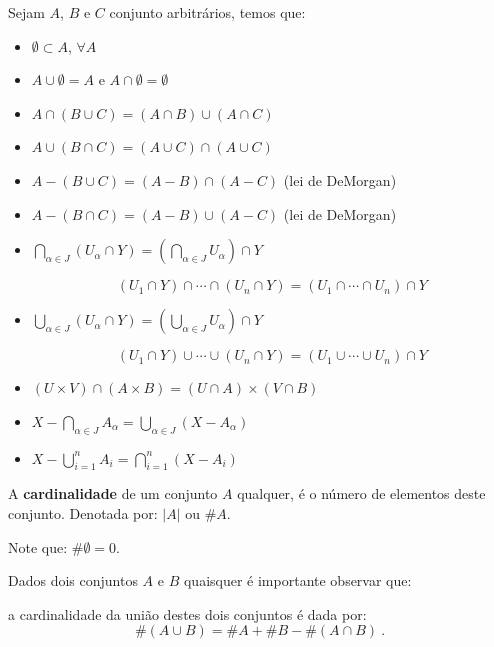 \begin{prop}
Sejam $A$, $B$ e $C$ conjunto arbitrários, temos que:
\begin{itemize}
 \item $\emptyset \subset A$, $\forall A$
 \item $A \cup \emptyset= A$ e $A \cap \emptyset= \emptyset$
 \item $A \cap (B \cup C) = (A \cap B) \cup (A \cap C)$
 \item $A \cup (B \cap C) = (A \cup C) \cap (A \cup C)$
 \item $A - (B \cup C) = (A - B) \cap (A - C)$ (lei de DeMorgan)
 \item $A - (B \cap C) = (A - B) \cup (A - C)$ (lei de DeMorgan)
 \item $\bigcap_{\alpha \in J}(U_{\alpha} \cap Y) = (\bigcap_{\alpha \in J} U_{\alpha}) \cap Y$
 
  $$(U_1 \cap Y) \cap \cdots \cap (U_n \cap Y) = (U_1 \cap \cdots \cap U_n) \cap Y$$
  
 \item $\bigcup_{\alpha \in J}(U_{\alpha} \cap Y) = (\bigcup_{\alpha \in J} U_{\alpha}) \cap Y$
 
 $$(U_1 \cap Y) \cup \cdots \cup (U_n \cap Y) = (U_1 \cup \cdots \cup U_n) \cap Y$$
 
 \item $(U \times V) \cap (A \times B) = (U \cap A) \times (V \cap B)$
 
 \item $X - \bigcap_{\alpha \in J} A_{\alpha} = \bigcup_{\alpha \in J}(X - A_{\alpha})$
 
 \item $X - \bigcup_{i= 1}^{n} A_i = \bigcap_{i = 1}^{n}(X - A_i)$
 
\end{itemize}
\end{prop}

 A \textbf{cardinalidade} de um conjunto $A$ qualquer, é o número de elementos deste conjunto. Denotada por: $|A|$ ou $\# A$. 
 
 Note que: $\# \emptyset= 0$.
 
 Dados dois conjuntos $A$ e $B$ quaisquer é importante observar que:
 \vskip0.3cm
 \colorbox{azul}{
 \begin{minipage}{14.5cm}
 \begin{center}
 a cardinalidade da união destes dois conjuntos é dada por:
  \[\#(A \cup B)= \# A + \# B - \#(A \cap B) \ .\]
 \end{center}
 \end{minipage}}
 \vskip0.3cm
 
